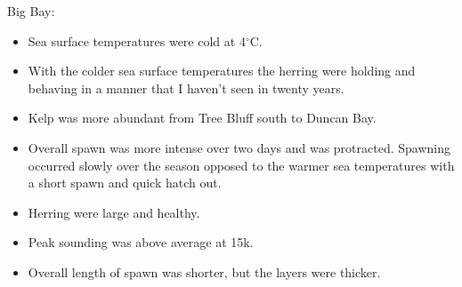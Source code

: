Big Bay:
\begin{itemize}
\item Sea surface temperatures were cold at 4$^\circ\text{C}$.
\item With the colder sea surface temperatures the herring were holding and
behaving in a manner that I haven't seen in twenty years.
\item Kelp was more abundant from Tree Bluff south to Duncan Bay. 
\item Overall spawn was more intense over two days and was protracted.
Spawning occurred slowly over the season opposed to the warmer sea temperatures with a short spawn and quick hatch out.
\item Herring were large and healthy.
\item Peak sounding was above average at 15k.
\item Overall length of spawn was shorter, but the layers were thicker.
\end{itemize}